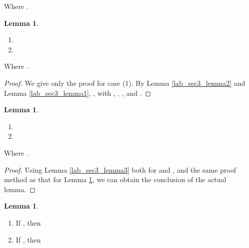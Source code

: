 \documentclass{mcom-l}
\theoremstyle{definition}
\newtheorem{sec3lemma5}[sec3lemma1]{Lemma}
\newtheorem{sec3lemma6}[sec3lemma1]{Lemma}
\newtheorem{sec3lemma7}[sec3lemma1]{Lemma}
\numberwithin{equation}{section}
\begin{document}
              Where .
              \begin{sec3lemma5}\label{lab_sec3_lemma5}
              \begin{enumerate} \item
              
              \item
              
              \end{enumerate}
              Where .
              \end{sec3lemma5}
              \begin{proof}
              We give only the proof for case (1). By Lemma \ref{lab_sec3_lemma2} and Lemma \ref{lab_sec3_lemma1}, , with , , , and .
              
              \end{proof}
            \begin{sec3lemma6}\label{lab_sec3_lemma6}
            \begin{enumerate} \item
            
            \item
            
            \end{enumerate}
            Where .
            \end{sec3lemma6}
            \begin{proof}
            Using Lemma \ref{lab_sec3_lemma3} both for  and , and the same proof method as that for Lemma \ref{lab_sec3_lemma5}, we can obtain the conclusion of the actual lemma.
            \end{proof}
            \begin{sec3lemma7}\label{lab_sec3_lemma7}
            \begin{enumerate}
            \item
            If , then
            
            \item
             If , then
             
            \end{enumerate}
            \end{sec3lemma7}
\end{document}
